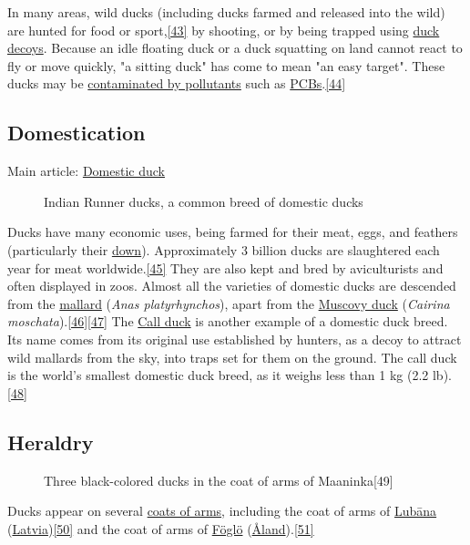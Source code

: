 \documentclass[11pt,a4paper]{article}
\begin{document}
In many areas, wild ducks (including ducks farmed and released into the wild) are hunted for food or sport,\href{\#cite\_note-43}{[43]} by shooting, or by being trapped using \href{/wiki/Duck\_decoy\_\%28structure\%29}{duck decoys}. Because an idle floating duck or a duck squatting on land cannot react to fly or move quickly, "a sitting duck" has come to mean "an easy target". These ducks may be \href{/wiki/Duck\_\%28food\%29\#Pollution}{contaminated by pollutants} such as \href{/wiki/Polychlorinated\_biphenyl}{PCBs}.\href{\#cite\_note-44}{[44]}

\subsection{Domestication}

Main article: \href{/wiki/Domestic\_duck}{Domestic duck}

\begin{figure}[h]
\caption{Indian Runner ducks, a common breed of domestic ducks}
\end{figure}

Ducks have many economic uses, being farmed for their meat, eggs, and feathers (particularly their \href{/wiki/Down\_feather}{down}). Approximately 3 billion ducks are slaughtered each year for meat worldwide.\href{\#cite\_note-45}{[45]} They are also kept and bred by aviculturists and often displayed in zoos. Almost all the varieties of domestic ducks are descended from the \href{/wiki/Mallard}{mallard} (\textit{Anas platyrhynchos}), apart from the \href{/wiki/Muscovy\_duck}{Muscovy duck} (\textit{Cairina moschata}).\href{\#cite\_note-46}{[46]}\href{\#cite\_note-47}{[47]} The \href{/wiki/Call\_duck}{Call duck} is another example of a domestic duck breed. Its name comes from its original use established by hunters, as a decoy to attract wild mallards from the sky, into traps set for them on the ground. The call duck is the world's smallest domestic duck breed, as it weighs less than 1 kg (2.2 lb).\href{\#cite\_note-48}{[48]}

\subsection{Heraldry}

\begin{figure}[h]
\caption{Three black-colored ducks in the coat of arms of Maaninka[49]}
\end{figure}

Ducks appear on several \href{/wiki/Coats\_of\_arms}{coats of arms}, including the coat of arms of \href{/wiki/Lub\%C4\%81na}{Lubāna} (\href{/wiki/Latvia}{Latvia})\href{\#cite\_note-50}{[50]} and the coat of arms of \href{/wiki/F\%C3\%B6gl\%C3\%B6}{Föglö} (\href{/wiki/\%C3\%85land}{Åland}).\href{\#cite\_note-51}{[51]}
\end{document}
